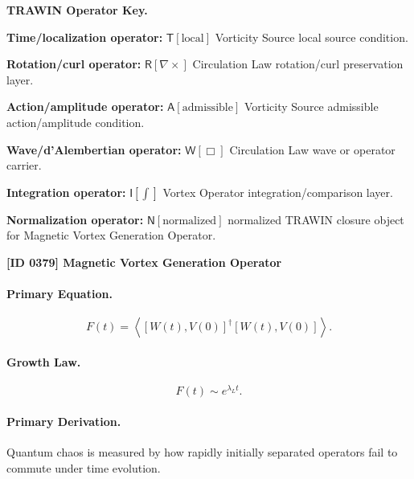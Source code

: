 \par\vspace{0.45\baselineskip}
\noindent\begin{minipage}[t]{\linewidth}
\begingroup
\small
\raggedright
\textbf{TRAWIN Operator Key.}\par
\noindent\textbf{Time/localization operator:} $\mathsf{T}\!\left[\mathrm{local}\right]$ Vorticity Source local source condition.\par
\noindent\textbf{Rotation/curl operator:} $\mathsf{R}\!\left[\nabla\times\right]$ Circulation Law rotation/curl preservation layer.\par
\noindent\textbf{Action/amplitude operator:} $\mathsf{A}\!\left[\mathrm{admissible}\right]$ Vorticity Source admissible action/amplitude condition.\par
\noindent\textbf{Wave/d'Alembertian operator:} $\mathsf{W}\!\left[\Box\right]$ Circulation Law wave or operator carrier.\par
\noindent\textbf{Integration operator:} $\mathsf{I}\!\left[\int\right]$ Vortex Operator integration/comparison layer.\par
\noindent\textbf{Normalization operator:} $\mathsf{N}\!\left[\mathrm{normalized}\right]$ normalized TRAWIN closure object for Magnetic Vortex Generation Operator.\par
\endgroup
\end{minipage}

\clearpage
\noindent\textbf{[ID 0379] Magnetic Vortex Generation Operator}\par
\vspace{0.35em}
\paragraph{Primary Equation.}
\begin{equation}
F(t)
=
\left\langle
[W(t),V(0)]^\dagger
[W(t),V(0)]
\right\rangle .
\end{equation}

\paragraph{Growth Law.}
\begin{equation}
F(t)\sim e^{\lambda_L t}.
\end{equation}

\paragraph{Primary Derivation.}
Quantum chaos is measured by how rapidly initially separated operators fail to commute under time evolution.

